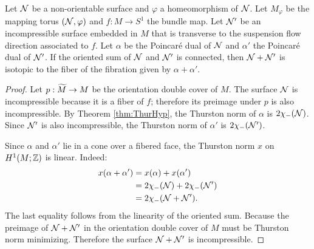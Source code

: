 \begin{thm}
  \label{thm:oriented-sum}
  Let $\mathcal{N}$ be a non-orientable surface and $\varphi$ a homeomorphism of $\mathcal{N}$.  Let $M_\varphi$ be the mapping torus $(\mathcal{N},\varphi)$ and $f:M\rightarrow S^1$ the bundle map.  Let $\mathcal{N}'$ be an incompressible surface embedded in $M$ that is transverse to the suspension flow direction associated to $f$.  Let $\alpha$ be the Poincar\'e dual of $\mathcal{N}$ and $\alpha'$ the Poincar\'e dual of $\mathcal{N}'$. If the oriented sum of $\mathcal{N}$ and $\mathcal{N}'$ is connected, then
  $\mathcal{N} + \mathcal{N}'$ is isotopic to the fiber of the fibration given by $\alpha + \alpha'$.
\end{thm}
\begin{proof}
  Let $p:\widetilde{M}\rightarrow M$ be the orientation double cover of $M$.  %
  The surface $\mathcal{N}$ is incompressible because it is a fiber of $f$; therefore its preimage under $p$ is also incompressible.  By Theorem \ref{thm:ThurHyp}, the Thurston norm of $\alpha$ is
  $2\chi_-(\mathcal{N})$.  Since $\mathcal{N}'$ is also incompressible, the Thurston norm of $\alpha'$ is $2\chi_-(\mathcal{N}')$.

  Since $\alpha$ and $\alpha'$ lie in a cone over a fibered face, the Thurston norm $x$ on $H^1(M;\mathbb{Z})$ is linear.  Indeed:
  \begin{align*}
    x(\alpha + \alpha') &= x(\alpha) + x(\alpha') \\
                        &= 2\chi_-(\mathcal{N}) + 2\chi_-(\mathcal{N}') \\
                        &= 2\chi_-(\mathcal{N} + \mathcal{N}').
  \end{align*}
  The last equality follows from the linearity of the oriented sum. Because the preimage of $\mathcal{N} + \mathcal{N}'$ in the orientation double cover of $M$ must be Thurston norm minimizing.  Therefore the surface $\mathcal{N}+\mathcal{N}'$ is incompressible.


\end{proof}

